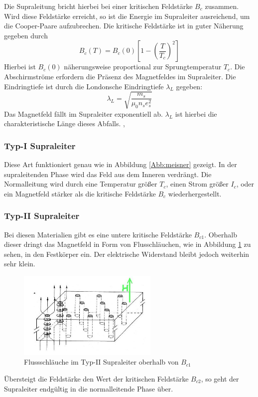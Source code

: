 Die Supraleitung bricht hierbei bei einer kritischen Feldstärke $B_c$ zusammen.
Wird diese Feldstärke erreicht, so ist die Energie im Supraleiter ausreichend,
um die Cooper-Paare aufzubrechen.
Die kritische Feldstärke ist in guter Näherung gegeben durch 
\[
	B_c (T) = B_c (0) \left[ 1- \left(\frac{T}{T_c}\right)^2 \right]
\]
Hierbei ist $B_c(0)$ näherungsweise proportional zur Sprungtemperatur $T_c$.
Die Abschirmströme erfordern die Präsenz des Magnetfeldes im Supraleiter. Die 
Eindringtiefe ist durch die Londonsche Eindringtiefe $\lambda_L$ gegeben:
\[
	\lambda_L = \sqrt{ \frac{m_s}{\mu_0 n_s e_s^2} }
\]
Das Magnetfeld fällt im Supraleiter exponentiell ab. $\lambda_L$ ist hierbei 
die charakteristische Länge dieses Abfalls.
\cite{hunklinger}, \cite{meisnerwiki}

		\subsubsection{Typ-I Supraleiter}
Diese Art funktioniert genau wie in Abbildung \ref{Abb:meisner} gezeigt. In der 
supraleitenden Phase wird das Feld aus dem Inneren verdrängt. Die Normalleitung 
wird durch eine Temperatur größer $T_c$, einen Strom größer $I_c$, oder ein
Magnetfeld stärker als die kritische Feldstärke $B_c$ wiederhergestellt. 
\cite{hunklinger}

		\subsubsection{Typ-II Supraleiter}
Bei diesen Materialien gibt es eine untere kritische Feldstärke $B_{c1}$. Oberhalb
dieser dringt das Magnetfeld in Form von Flusschläuchen, wie in Abbildung 
\ref{Abb:flusschlauch} zu sehen, in den Festkörper ein. Der elektrische Widerstand
bleibt jedoch weiterhin sehr klein.
\begin{figure}[h!]
	\centering
	\includegraphics[width=0.6\textwidth]{Abb/flussschlauch.jpg}
	\caption{Flussschläuche im Typ-II Supraleiter oberhalb von $B_{c1}$ 
		     \cite{flussschlauchbild}}
	\label{Abb:flusschlauch}
\end{figure}
Übersteigt die Feldstärke den Wert der kritischen Feldstärke $B_{c2}$, so geht
der Supraleiter endgültig in die normalleitende Phase über. \cite{hunklinger}


